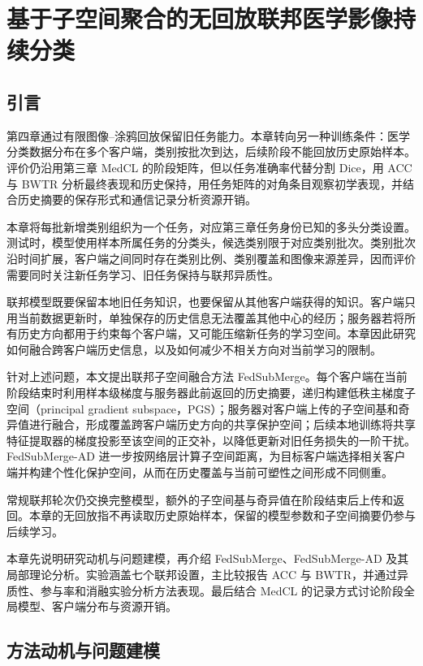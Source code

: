 \chapter{基于子空间聚合的无回放联邦医学影像持续分类}
\label{chap:fedsubmerge}
\setlength{\emergencystretch}{1em}

\section{引言}
\label{sec:fedsubmerge-introduction}

第四章通过有限图像--涂鸦回放保留旧任务能力。本章转向另一种训练条件：医学分类数据分布在多个客户端，类别按批次到达，后续阶段不能回放历史原始样本。评价仍沿用第三章 MedCL 的阶段矩阵，但以任务准确率代替分割 Dice，用 ACC 与 BWTR 分析最终表现和历史保持，用任务矩阵的对角条目观察初学表现，并结合历史摘要的保存形式和通信记录分析资源开销。

本章将每批新增类别组织为一个任务，对应第三章任务身份已知的多头分类设置。测试时，模型使用样本所属任务的分类头，候选类别限于对应类别批次。类别批次沿时间扩展，客户端之间同时存在类别比例、类别覆盖和图像来源差异，因而评价需要同时关注新任务学习、旧任务保持与联邦异质性。

联邦模型既要保留本地旧任务知识，也要保留从其他客户端获得的知识。客户端只用当前数据更新时，单独保存的历史信息无法覆盖其他中心的经历；服务器若将所有历史方向都用于约束每个客户端，又可能压缩新任务的学习空间。本章因此研究如何融合跨客户端历史信息，以及如何减少不相关方向对当前学习的限制。

针对上述问题，本文提出联邦子空间融合方法 FedSubMerge。每个客户端在当前阶段结束时利用样本级梯度与服务器此前返回的历史摘要，递归构建低秩主梯度子空间（principal gradient subspace，PGS）；服务器对客户端上传的子空间基和奇异值进行融合，形成覆盖跨客户端历史方向的共享保护空间；后续本地训练将共享特征提取器的梯度投影至该空间的正交补，以降低更新对旧任务损失的一阶干扰。FedSubMerge-AD 进一步按网络层计算子空间距离，为目标客户端选择相关客户端并构建个性化保护空间，从而在历史覆盖与当前可塑性之间形成不同侧重。

常规联邦轮次仍交换完整模型，额外的子空间基与奇异值在阶段结束后上传和返回。本章的无回放指不再读取历史原始样本，保留的模型参数和子空间摘要仍参与后续学习。

本章先说明研究动机与问题建模，再介绍 FedSubMerge、FedSubMerge-AD 及其局部理论分析。实验涵盖七个联邦设置，主比较报告 ACC 与 BWTR，并通过异质性、参与率和消融实验分析方法表现。最后结合 MedCL 的记录方式讨论阶段全局模型、客户端分布与资源开销。

\section{方法动机与问题建模}
